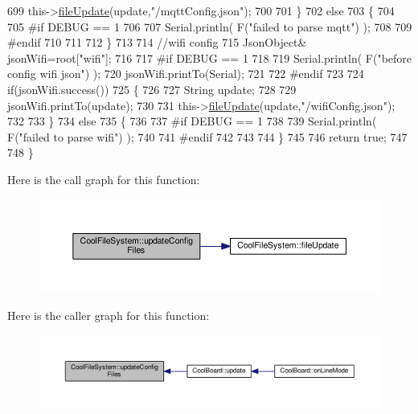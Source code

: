 \begin{DoxyCode}
699         this->\hyperlink{class_cool_file_system_a13f2958f5b87757c31fc53797a30d23a}{fileUpdate}(update,\textcolor{stringliteral}{"/mqttConfig.json"});      
700 
701     \}
702     \textcolor{keywordflow}{else}
703     \{
704 
705 \textcolor{preprocessor}{    #if DEBUG == 1 }
706 
707         Serial.println( F(\textcolor{stringliteral}{"failed to parse mqtt"}) );
708     
709 \textcolor{preprocessor}{    #endif}
710 
711     
712     \}   
713 
714     \textcolor{comment}{//wifi config}
715         JsonObject& jsonWifi=root[\textcolor{stringliteral}{"wifi"}];
716     
717 \textcolor{preprocessor}{#if DEBUG == 1 }
718 
719     Serial.println( F(\textcolor{stringliteral}{"before config wifi json"}) );
720     jsonWifi.printTo(Serial);
721 
722 \textcolor{preprocessor}{#endif}
723 
724     \textcolor{keywordflow}{if}(jsonWifi.success())
725     \{
726 
727         String update;
728     
729         jsonWifi.printTo(update);
730 
731         this->\hyperlink{class_cool_file_system_a13f2958f5b87757c31fc53797a30d23a}{fileUpdate}(update,\textcolor{stringliteral}{"/wifiConfig.json"});      
732 
733     \}
734     \textcolor{keywordflow}{else}
735     \{
736 
737 \textcolor{preprocessor}{    #if DEBUG == 1 }
738 
739         Serial.println( F(\textcolor{stringliteral}{"failed to parse wifi"}) );
740     
741 \textcolor{preprocessor}{    #endif}
742 
743     
744     \}   
745         
746     \textcolor{keywordflow}{return} \textcolor{keyword}{true};
747 
748 \}   
\end{DoxyCode}
Here is the call graph for this function\+:\nopagebreak
\begin{figure}[H]
\begin{center}
\leavevmode
\includegraphics[width=350pt]{db/d0c/class_cool_file_system_adfa8e2e80641ae6f0cceabd348a9b841_cgraph}
\end{center}
\end{figure}
Here is the caller graph for this function\+:\nopagebreak
\begin{figure}[H]
\begin{center}
\leavevmode
\includegraphics[width=350pt]{db/d0c/class_cool_file_system_adfa8e2e80641ae6f0cceabd348a9b841_icgraph}
\end{center}
\end{figure}


